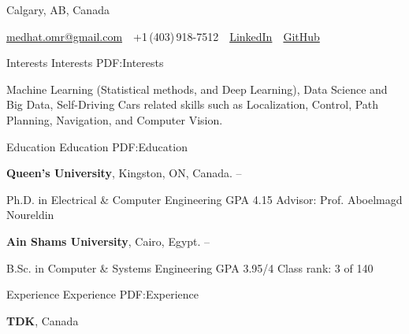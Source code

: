 \documentclass[letterpaper,MMMyyyy,nonstopmode]{simpleresumecv}
\newcommand{\CVAuthor}{Medhat Omr}
\newcommand{\CVWebpage}{https://www.linkedin.com/in/medhatomr}
\newcommand{\github}{https://github.com/momr}
\begin{document}

\Title{\CVAuthor}


\begin{SubTitle}
{Calgary, AB, Canada}
\par
\href{mailto:medhat.omr@gmail.com}
{medhat.omr@gmail.com}
\,\SubBulletSymbol\,
+1\,(403)\,918-7512
\,\SubBulletSymbol\,
\href{\CVWebpage}
{\url{LinkedIn}}
\,\SubBulletSymbol\,
\href{\github}
{\url{GitHub}}
\end{SubTitle}

\begin{Body}




\Section
{Interests}
{Interests}
{PDF:Interests}

\Entry
Machine Learning (Statistical methods, and Deep Learning),
Data Science and Big Data, 
Self-Driving Cars related skills such as Localization, Control, Path Planning, Navigation, and Computer Vision.




\Section
{Education}
{Education}
{PDF:Education}


\Entry
{\textbf{Queen's University}},
Kingston, ON, Canada. 
\hfill
{} --

\Gap
Ph.D. in 
{Electrical \& Computer Engineering}
\hfill
GPA 4.15
\BulletItem
Advisor: Prof. 
{Aboelmagd Noureldin}


\BigGap
\Entry
{\textbf{Ain Shams University}},
Cairo, Egypt. 
\hfill
{} --

\Gap
B.Sc. in 
{Computer \& Systems Engineering }
\hfill
GPA 3.95/4
\BulletItem
Class rank: 3 of 140




\Section
{Experience}
{Experience}
{PDF:Experience}

\Entry
{\textbf{TDK}}, Canada


\end{Body}
\end{document}
